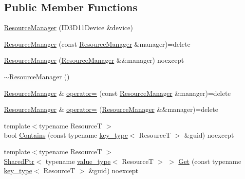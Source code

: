 \subsection*{Public Member Functions}
\begin{DoxyCompactItemize}
\item 
\mbox{\hyperlink{classmage_1_1rendering_1_1_resource_manager_a2274df2c0badb1dd2e79642e69c76cb7}{Resource\+Manager}} (I\+D3\+D11\+Device \&device)
\item 
\mbox{\hyperlink{classmage_1_1rendering_1_1_resource_manager_a94b757238211a5b6fe44d773b579ca0a}{Resource\+Manager}} (const \mbox{\hyperlink{classmage_1_1rendering_1_1_resource_manager}{Resource\+Manager}} \&manager)=delete
\item 
\mbox{\hyperlink{classmage_1_1rendering_1_1_resource_manager_a3d54199cf484d11c1d1039eeb306016c}{Resource\+Manager}} (\mbox{\hyperlink{classmage_1_1rendering_1_1_resource_manager}{Resource\+Manager}} \&\&manager) noexcept
\item 
\mbox{\hyperlink{classmage_1_1rendering_1_1_resource_manager_a7289ca2a270e6de613eff041ba04d4a4}{$\sim$\+Resource\+Manager}} ()
\item 
\mbox{\hyperlink{classmage_1_1rendering_1_1_resource_manager}{Resource\+Manager}} \& \mbox{\hyperlink{classmage_1_1rendering_1_1_resource_manager_a188467ab4e46176ee5184c9f5e5ac64f}{operator=}} (const \mbox{\hyperlink{classmage_1_1rendering_1_1_resource_manager}{Resource\+Manager}} \&manager)=delete
\item 
\mbox{\hyperlink{classmage_1_1rendering_1_1_resource_manager}{Resource\+Manager}} \& \mbox{\hyperlink{classmage_1_1rendering_1_1_resource_manager_a1e3f511409bcde3a7a3296364a0298f5}{operator=}} (\mbox{\hyperlink{classmage_1_1rendering_1_1_resource_manager}{Resource\+Manager}} \&\&manager)=delete
\item 
{\footnotesize template$<$typename ResourceT $>$ }\\bool \mbox{\hyperlink{classmage_1_1rendering_1_1_resource_manager_a7df24baa95d7a43697cba243dd5b5a54}{Contains}} (const typename \mbox{\hyperlink{classmage_1_1rendering_1_1_resource_manager_a097b505b275b411e02c73d1899e91a44}{key\+\_\+type}}$<$ ResourceT $>$ \&guid) noexcept
\item 
{\footnotesize template$<$typename ResourceT $>$ }\\\mbox{\hyperlink{namespacemage_a1e01ae66713838a7a67d30e44c67703e}{Shared\+Ptr}}$<$ typename \mbox{\hyperlink{classmage_1_1rendering_1_1_resource_manager_abb6ad8fd8054364a230839110c42174f}{value\+\_\+type}}$<$ ResourceT $>$ $>$ \mbox{\hyperlink{classmage_1_1rendering_1_1_resource_manager_aeb229ae49bde59cb6c146f9749851363}{Get}} (const typename \mbox{\hyperlink{classmage_1_1rendering_1_1_resource_manager_a097b505b275b411e02c73d1899e91a44}{key\+\_\+type}}$<$ ResourceT $>$ \&guid) noexcept

\end{DoxyCompactItemize}
